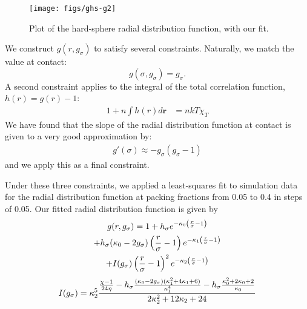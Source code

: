 \documentclass[letterpaper,twocolumn,amsmath,amssymb,pre,aps,10pt]{revtex4-1}
\newcommand{\rr}{\textbf{r}}
\begin{document}
\begin{figure}
  \centering
  \texttt{[image: figs/ghs-g2]}%
  \caption{Plot of the hard-sphere radial distribution function, with
    our fit.}\label{fig:radial-distribution}
\end{figure}

We construct $g(r, g_\sigma)$ to satisfy several constraints.
Naturally, we match the value at contact:
\begin{equation}
  g(\sigma, g_\sigma) = g_\sigma.
\end{equation}
A second constraint applies to the integral of the total correlation
function, $h(r) = g(r) - 1$:
\begin{align}
  1 + n\int h(r)d\rr &= nkT\chi_T \label{eq:total-constraint}
\end{align}
We have found that the slope of the radial distribution function at
contact is given to a very good approximation by:
\begin{align}
  g'(\sigma) \approx - g_\sigma (g_\sigma - 1)
\end{align}
and we apply this as a final constraint.\par
Under these three constraints, we applied a least-squares fit to
simulation data for the radial distribution function at packing
fractions from 0.05 to 0.4 in steps of 0.05.  Our fitted radial
distribution function is given by
\begin{multline}
  g(r,g_\sigma) = 1 + h_\sigma e^{-\kappa_0 \left(\frac{r}{\sigma}-1\right)} \\
  + h_\sigma(\kappa_0 - 2g_\sigma)  \left(\frac{r}{\sigma}-1\right)e^{-\kappa_1  \left(\frac{r}{\sigma}-1\right)} \\
  + I(g_\sigma)  \left(\frac{r}{\sigma}-1\right)^2e^{-\kappa_2  \left(\frac{r}{\sigma}-1\right)}
\end{multline}
\begin{equation}
  I(g_\sigma) = \kappa_2^5 \frac{
    \frac{\chi-1}{24\eta} - h_\sigma \frac{(\kappa_0-2
      g_\sigma)(\kappa_1^2 + 4 \kappa_1 + 6)}{\kappa_1^4}
    - h_\sigma\frac{\kappa_0^2 + 2\kappa_0 + 2}{\kappa_0}
  }{2 \kappa_2^2 + 12 \kappa_2 + 24}
\end{equation}
\end{document}
